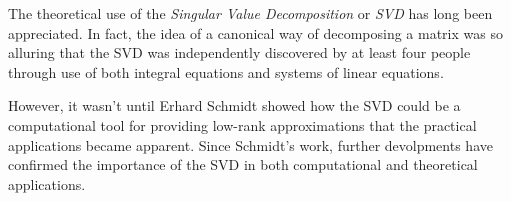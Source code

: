 
\label{lab:SVD}
%

The theoretical use of the \emph{Singular Value Decomposition} or \emph{SVD} has long been appreciated.
In fact, the idea of a canonical way of decomposing a matrix was so alluring that the SVD was independently discovered by at least four people through use of both  integral equations and systems of linear equations.

However, it wasn't until Erhard Schmidt showed how the SVD could be a computational tool for providing low-rank approximations that the practical applications became apparent.
Since Schmidt's work, further devolpments have confirmed the importance of the SVD in both computational and theoretical applications.

